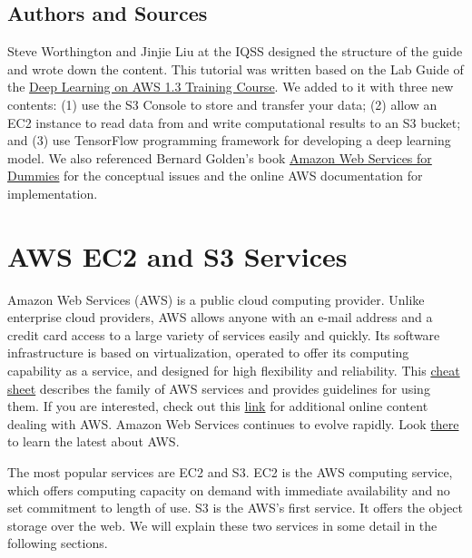 \documentclass[]{book}
\begin{document}
\hypertarget{authors-and-sources}{%
\section*{Authors and Sources}\label{authors-and-sources}}

Steve Worthington and Jinjie Liu at the IQSS designed the structure of the guide and wrote down the content. This tutorial was written based on the Lab Guide of the \href{https://bit.ly/aws-dlg-2019-06-21}{Deep Learning on AWS 1.3 Training Course}. We added to it with three new contents: (1) use the S3 Console to store and transfer your data; (2) allow an EC2 instance to read data from and write computational results to an S3 bucket; and (3) use TensorFlow programming framework for developing a deep learning model. We also referenced Bernard Golden's book \href{https://fit.mta.edu.vn/files/DanhSach/Book_Amazon\%20webservices\%20for\%20dummies.pdf}{Amazon Web Services for Dummies} for the conceptual issues and the online AWS documentation for implementation.

\hypertarget{aws-ec2-and-s3-services}{%
\chapter{AWS EC2 and S3 Services}\label{aws-ec2-and-s3-services}}

Amazon Web Services (AWS) is a public cloud computing provider. Unlike enterprise cloud providers, AWS allows anyone with an e-mail address and a credit card access to a large variety of services easily and quickly. Its software infrastructure is based on virtualization, operated to offer its computing capability as a service, and designed for high flexibility and reliability. This \href{https://www.dummies.com/programming/cloud-computing/amazon-web-services/aws-admins-dummies-cheat-sheet/}{cheat sheet} describes the family of AWS services and provides guidelines for using them. If you are interested, check out this \href{https://www.dummies.com/programming/cloud-computing/amazon-web-services/}{link} for additional online content dealing with AWS. Amazon Web Services continues to evolve rapidly. Look \href{https://bernardgolden.com}{there} to learn the latest about AWS.

The most popular services are EC2 and S3. EC2 is the AWS computing service, which offers computing capacity on demand with immediate availability and no set commitment to length of use. S3 is the AWS's first service. It offers the object storage over the web. We will explain these two services in some detail in the following sections.
\end{document}
